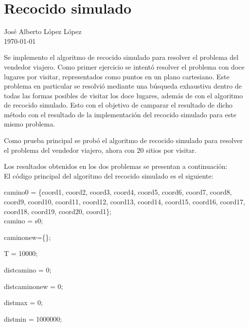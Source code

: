 \documentclass[11pt, table]{report}
\begin{document}
\renewcommand{\tablename}{}

\section*{\justify \Huge Recocido simulado}

\vspace{1cm}

\begin{flushright}
José Alberto López López \\
\today \\
\end{flushright}

\vspace{0.5cm}

{\justify Se implemento el algoritmo de recocido simulado para resolver el problema del vendedor viajero. Como primer ejercicio se intentó resolver el problema con doce lugares por visitar, representados como puntos en un plano cartesiano. Este problema en particular se resolvió mediante una búsqueda exhaustiva dentro de todas las formas posibles de visitar los doce lugares, además de con el algoritmo de recocido simulado. Esto con el objetivo de camparar el resultado de dicho método con el resultado de la implementación del recocido simulado para este mismo problema. 

Como prueba principal se probó el algoritmo de recocido simulado para resolver el problema del vendedor viajero, ahora con 20 sitios por visitar. 

Los resultados obtenidos en los dos problemas se presentan a continuación:\\

El código principal del algoritmo del recocido simulado es el siguiente:

\pagebreak


{\fontUbuntuLight

camino0 = \{coord1, coord2, coord3, coord4, coord5, coord6, coord7, coord8, coord9, coord10, coord11, coord12, coord13, coord14, coord15, coord16, coord17, coord18, coord19, coord20, coord1\};\\

camino = s0;

caminonew=\{\};

T = 10000;

distcamino = 0;

distcaminonew = 0;

distmax = 0;

distmin = 1000000;

}}
\end{document}
